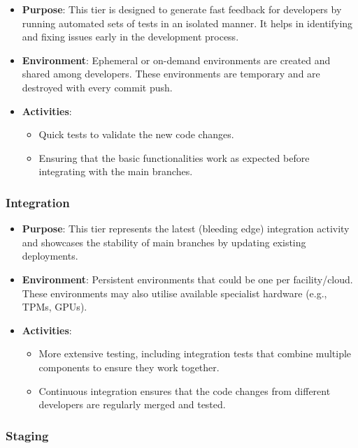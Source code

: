 \documentclass[a4paper]{spie}  %
\begin{document}
\begin{itemize}
    \item \textbf{Purpose}: This tier is designed to generate fast feedback for developers by running automated sets of tests in an isolated manner. It helps in identifying and fixing issues early in the development process.
    \item \textbf{Environment}: Ephemeral or on-demand environments are created and shared among developers. These environments are temporary and are destroyed with every commit push.
    \item \textbf{Activities}:
    \begin{itemize}
        \item Quick tests to validate the new code changes.
        \item Ensuring that the basic functionalities work as expected before integrating with the main branches.
    \end{itemize}
\end{itemize}

\subsubsection*{Integration}

\begin{itemize}
    \item \textbf{Purpose}: This tier represents the latest (bleeding edge) integration activity and showcases the stability of main branches by updating existing deployments.
    \item \textbf{Environment}: Persistent environments that could be one per facility/cloud. These environments may also utilise available specialist hardware (e.g., TPMs, GPUs).
    \item \textbf{Activities}:
    \begin{itemize}
        \item More extensive testing, including integration tests that combine multiple components to ensure they work together.
        \item Continuous integration ensures that the code changes from different developers are regularly merged and tested.
    \end{itemize}
\end{itemize}

\subsubsection*{Staging}
\end{document}
